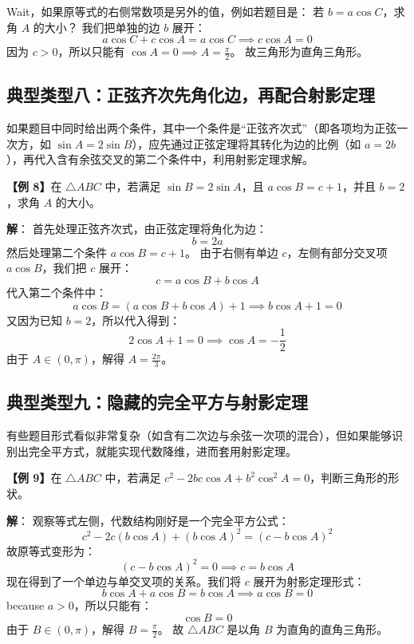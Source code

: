 \documentclass[11pt, a4paper]{ctexart}
\begin{document}
Wait，如果原等式的右侧常数项是另外的值，例如若题目是：
若 $b = a\cos C$，求角 $A$ 的大小？
我们把单独的边 $b$ 展开：
\[
a\cos C + c\cos A = a\cos C \implies c\cos A = 0
\]
因为 $c > 0$，所以只能有 $\cos A = 0 \implies A = \frac{\pi}{2}$。
故三角形为直角三角形。

\subsection{典型类型八：正弦齐次先角化边，再配合射影定理}
如果题目中同时给出两个条件，其中一个条件是“正弦齐次式”（即各项均为正弦一次方，如 $\sin A = 2\sin B$），应先通过正弦定理将其转化为边的比例（如 $a = 2b$），再代入含有余弦交叉的第二个条件中，利用射影定理求解。
\begin{tcolorbox}[colback=white, colframe=black!60, boxrule=0.5pt, arc=1pt, before skip=0.2em, after skip=0.2em]
\textbf{【例 8】}在 $\triangle ABC$ 中，若满足 $\sin B = 2\sin A$，且 $a\cos B = c + 1$，并且 $b=2$，求角 $A$ 的大小。
\end{tcolorbox}
\textbf{解}：
首先处理正弦齐次式，由正弦定理将角化为边：
\[
b = 2a
\]
然后处理第二个条件 $a\cos B = c + 1$。
由于右侧有单边 $c$，左侧有部分交叉项 $a\cos B$，我们把 $c$ 展开：
\[
c = a\cos B + b\cos A
\]
代入第二个条件中：
\[
a\cos B = (a\cos B + b\cos A) + 1 \implies b\cos A + 1 = 0
\]
又因为已知 $b = 2$，所以代入得到：
\[
2\cos A + 1 = 0 \implies \cos A = -\frac{1}{2}
\]
由于 $A \in (0, \pi)$，解得 $A = \frac{2\pi}{3}$。

\subsection{典型类型九：隐藏的完全平方与射影定理}
有些题目形式看似非常复杂（如含有二次边与余弦一次项的混合），但如果能够识别出完全平方式，就能实现代数降维，进而套用射影定理。
\begin{tcolorbox}[colback=white, colframe=black!60, boxrule=0.5pt, arc=1pt, before skip=0.2em, after skip=0.2em]
\textbf{【例 9】}在 $\triangle ABC$ 中，若满足 $c^2 - 2bc\cos A + b^2\cos^2 A = 0$，判断三角形的形状。
\end{tcolorbox}
\textbf{解}：
观察等式左侧，代数结构刚好是一个完全平方公式：
\[
c^2 - 2c(b\cos A) + (b\cos A)^2 = (c - b\cos A)^2
\]
故原等式变形为：
\[
(c - b\cos A)^2 = 0 \implies c = b\cos A
\]
现在得到了一个单边与单交叉项的关系。我们将 $c$ 展开为射影定理形式：
\[
b\cos A + a\cos B = b\cos A \implies a\cos B = 0
\]
because $a > 0$，所以只能有：
\[
\cos B = 0
\]
由于 $B \in (0, \pi)$，解得 $B = \frac{\pi}{2}$。
故 $\triangle ABC$ 是以角 $B$ 为直角的直角三角形。
\end{document}
